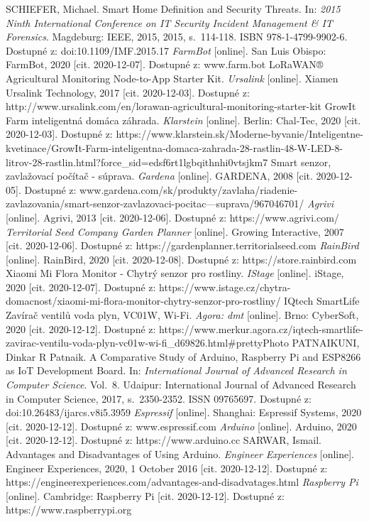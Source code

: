 \documentclass[twoside]{ctuthesis}
\theoremstyle{plain}
\theoremstyle{definition}
\theoremstyle{note}
\begin{document}
\begin{thebibliography}{46}
SCHIEFER, Michael. Smart Home Definition and Security Threats. In: \textit{2015 Ninth International Conference on IT Security Incident Management \& IT Forensics}. Magdeburg: IEEE, 2015, 2015, s.~114-118. ISBN 978-1-4799-9902-6. Dostupné z: doi:10.1109/IMF.2015.17
 \textit{FarmBot} [online]. San Luis Obispo: FarmBot, 2020 [cit. 2020-12-07]. Dostupné z: www.farm.bot
LoRaWAN® Agricultural Monitoring Node-to-App Starter Kit. \textit{Ursalink} [online]. Xiamen Ursalink Technology, 2017 [cit. 2020-12-03]. Dostupné z: http://www.ursalink.com/en/lorawan-agricultural-monitoring-starter-kit
GrowIt Farm inteligentná domáca záhrada. \textit{Klarstein} [online]. Berlin: Chal-Tec, 2020 [cit. 2020-12-03]. Dostupné z: https://www.klarstein.sk/Moderne-byvanie/Inteligentne-kvetinace/GrowIt-Farm-inteligentna-domaca-zahrada-28-rastlin-48-W-LED-8-litrov-28-rastlin.html?force\_sid=edsf6rt1lgbqithnhi0vtsjkm7
 Smart senzor, zavlažovací počítač - súprava. \textit{Gardena} [online]. GARDENA, 2008 [cit. 2020-12-05]. Dostupné z: www.gardena.com/sk/produkty/zavlaha/riadenie-zavlazovania/smart-senzor-zavlazovaci-pocitac---suprava/967046701/
 \textit{Agrivi} [online]. Agrivi, 2013 [cit. 2020-12-06]. Dostupné z: https://www.agrivi.com/
 \textit{Territorial Seed Company Garden Planner} [online]. Growing Interactive, 2007 [cit. 2020-12-06]. Dostupné z: https://gardenplanner.territorialseed.com
 \textit{RainBird} [online]. RainBird, 2020 [cit. 2020-12-08]. Dostupné z: https://store.rainbird.com
 Xiaomi Mi Flora Monitor - Chytrý senzor pro rostliny. \textit{IStage} [online]. iStage, 2020 [cit. 2020-12-07]. Dostupné z: https://www.istage.cz/chytra-domacnost/xiaomi-mi-flora-monitor-chytry-senzor-pro-rostliny/
IQtech SmartLife Zavírač ventilů voda plyn, VC01W, Wi-Fi. \textit{Agora: dmt} [online]. Brno: CyberSoft, 2020 [cit. 2020-12-12]. Dostupné z: https://www.merkur.agora.cz/iqtech-smartlife-zavirac-ventilu-voda-plyn-vc01w-wi-fi\_d69826.html\#prettyPhoto
 PATNAIKUNI, Dinkar R Patnaik. A Comparative Study of Arduino, Raspberry Pi and ESP8266 as IoT Development Board. In: \textit{International Journal of Advanced Research in Computer Science}. Vol.~8. Udaipur: International Journal of Advanced Research in Computer Science, 2017, s.~2350-2352. ISSN 09765697. Dostupné z: doi:10.26483/ijarcs.v8i5.3959
 \textit{Espressif} [online]. Shanghai: Espressif Systems, 2020 [cit. 2020-12-12]. Dostupné z: www.espressif.com
 \textit{Arduino} [online]. Arduino, 2020 [cit. 2020-12-12]. Dostupné z: https://www.arduino.cc
 SARWAR, Ismail. Advantages and Disadvantages of Using Arduino. \textit{Engineer Experiences} [online]. Engineer Experiences, 2020, 1 October 2016 [cit. 2020-12-12]. Dostupné z: https://engineerexperiences.com/advantages-and-disadvatages.html
 \textit{Raspberry Pi} [online]. Cambridge: Raspberry Pi [cit. 2020-12-12]. Dostupné z: https://www.raspberrypi.org
\end{thebibliography}
\end{document}
